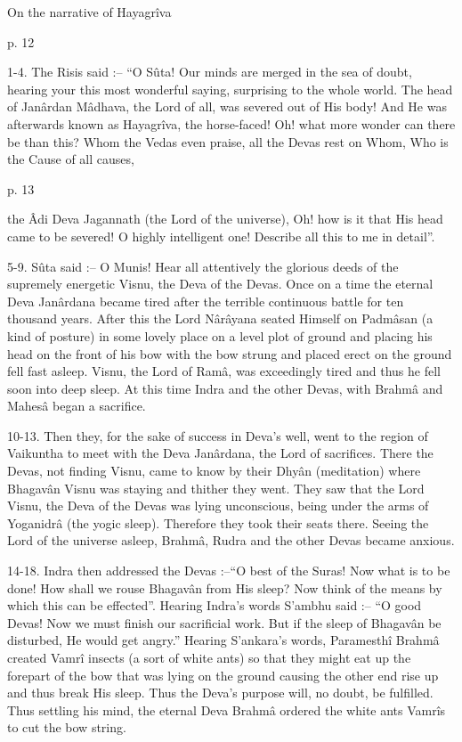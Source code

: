 On the narrative of Hayagrîva

 

p. 12

 

1-4. The Risis said :-- “O Sûta! Our minds are merged in the sea of doubt, hearing your this most wonderful saying, surprising to the whole world. The head of Janârdan Mâdhava, the Lord of all, was severed out of His body! And He was afterwards known as Hayagrîva, the horse-faced! Oh! what more wonder can there be than this? Whom the Vedas even praise, all the Devas rest on Whom, Who is the Cause of all causes,

 

p. 13

 

the Âdi Deva Jagannath (the Lord of the universe), Oh! how is it that His head came to be severed! O highly intelligent one! Describe all this to me in detail”.

 

5-9. Sûta said :-- O Munis! Hear all attentively the glorious deeds of the supremely energetic Visnu, the Deva of the Devas. Once on a time the eternal Deva Janârdana became tired after the terrible continuous battle for ten thousand years. After this the Lord Nârâyana seated Himself on Padmâsan (a kind of posture) in some lovely place on a level plot of ground and placing his head on the front of his bow with the bow strung and placed erect on the ground fell fast asleep. Visnu, the Lord of Ramâ, was exceedingly tired and thus he fell soon into deep sleep. At this time Indra and the other Devas, with Brahmâ and Mahesâ began a sacrifice.

 

10-13. Then they, for the sake of success in Deva's well, went to the region of Vaikuntha to meet with the Deva Janârdana, the Lord of sacrifices. There the Devas, not finding Visnu, came to know by their Dhyân (meditation) where Bhagavân Visnu was staying and thither they went. They saw that the Lord Visnu, the Deva of the Devas was lying unconscious, being under the arms of Yoganidrâ (the yogic sleep). Therefore they took their seats there. Seeing the Lord of the universe asleep, Brahmâ, Rudra and the other Devas became anxious.

 

14-18. Indra then addressed the Devas :--“O best of the Suras! Now what is to be done! How shall we rouse Bhagavân from His sleep? Now think of the means by which this can be effected”. Hearing Indra's words S’ambhu said :-- “O good Devas! Now we must finish our sacrificial work. But if the sleep of Bhagavân be disturbed, He would get angry.” Hearing S’ankara's words, Paramesthî Brahmâ created Vamrî insects (a sort of white ants) so that they might eat up the forepart of the bow that was lying on the ground causing the other end rise up and thus break His sleep. Thus the Deva's purpose will, no doubt, be fulfilled. Thus settling his mind, the eternal Deva Brahmâ ordered the white ants Vamrîs to cut the bow string.


